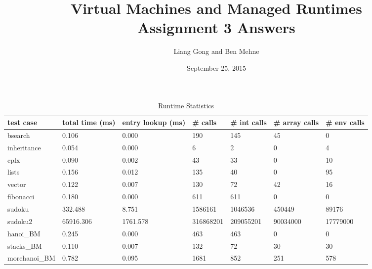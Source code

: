 \documentclass[notitlepage]{report}
\title{\vspace{-0.5in}Virtual Machines and Managed Runtimes \\ Assignment 3 Answers}
\date{\vspace{-0.5in}September 25, 2015}
\author{\vspace{-0.5in}Liang Gong and Ben Mehne\vspace{-0.5in}}
\begin{document}
\maketitle

\begin{table}[!htp]
\centering
\caption{Runtime Statistics}
\label{statistics}
{\footnotesize
\begin{tabular}{lllllll}
\toprule
test case & total time (ms)    & entry lookup (ms) & \# calls & \# int calls & \# array calls & \# env calls \\
\midrule
bsearch        & 0.106          & 0.000          & 190            & 145            & 45             & 0              \\
inheritance    & 0.054          & 0.000          & 6              & 2              & 0              & 4              \\
cplx           & 0.090          & 0.002          & 43             & 33             & 0              & 10             \\
lists          & 0.156          & 0.012          & 135            & 40             & 0              & 95             \\
vector         & 0.122          & 0.007          & 130            & 72             & 42             & 16             \\
fibonacci      & 0.180          & 0.000          & 611            & 611            & 0              & 0              \\
sudoku         & 332.488        & 8.751          & 1586161        & 1046536        & 450449         & 89176          \\
sudoku2        & 65916.306      & 1761.578       & 316868201      & 209055201      & 90034000       & 17779000       \\
hanoi\_BM      & 0.245          & 0.000          & 463            & 463            & 0              & 0              \\
stacks\_BM     & 0.110          & 0.007          & 132            & 72             & 30             & 30             \\
morehanoi\_BM  & 0.782          & 0.095          & 1681           & 852            & 251            & 578            \\
\bottomrule
\end{tabular}
}
\end{table}
\end{document}
